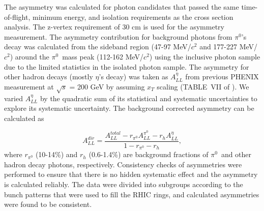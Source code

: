 \documentclass[twocolumn,letterpaper,aps,prl,longbibliography,superscriptaddress,floatfix]{revtex4-2}
\newcommand{\pizero}{\ensuremath{\pi^0}}
\newcommand{\ALL}{\ensuremath{A_{LL}}}
\begin{document}
The asymmetry was calculated for photon candidates that passed the same time-of-flight, minimum energy, and isolation requirements as the cross section analysis. The z-vertex requirement of 30 cm is used for the asymmetry measurement. The asymmetry contribution for background photons from \pizero's decay was calculated from the sideband region (47-97 MeV/$c^2$ and 177-227 MeV/$c^2$) around the \pizero\ mass peak (112-162 MeV/$c^2$) using the inclusive photon sample due to the limited statistics in the isolated photon sample. The asymmetry for other hadron decays (mostly $\eta$'s decay) was taken as $A_{LL}^{\eta}$ from previous PHENIX measurement at $\sqrt{s}$ = 200 GeV by assuming $x_T$ scaling (TABLE~VII of \cite{PhysRevD.90.012007}). We varied $A_{LL}^{\eta}$ by the quadratic sum of its statistical and systematic uncertainties to explore its systematic uncertainty. The background corrected asymmetry can be calculated as

\begin{equation} \label{eq:all-dir}
A_{LL}^{dir} = \frac{A_{LL}^{total} - r_{\pi^0}A_{LL}^{\pi^0} -r_h A_{LL}^{\eta}}{1 - r_{\pi^0} - r_h},
\end{equation}
where $r_{\pi^0}$ (10-14\%) and $r_h$ (0.6-1.4\%) are background fractions of \pizero\ and other hadron decay photons, respectively. Consistency checks of asymmetries were performed to ensure that there is no hidden systematic effect and the asymmetry is calculated reliably. The data were divided into subgroups according to the bunch patterns that were used to fill the RHIC rings, and calculated asymmetries were found to be consistent.

\end{document}
